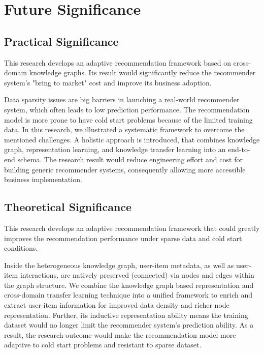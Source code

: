 \section{Future Significance}

\subsection{Practical Significance}
This research develops an adaptive recommendation framework based on cross-domain knowledge graphs. Its result would significantly reduce the recommender system's "bring to market" cost and improve its business adoption.

Data sparsity issues are big barriers in launching a real-world recommender system, which often leads to low prediction performance. 
The recommendation model is more prone to have cold start problems because of the limited training data. 
In this research, we illustrated a systematic framework to overcome the mentioned challenges. 
A holistic approach is introduced, that combines knowledge graph, representation learning, and knowledge transfer learning into an end-to-end schema. 
The research result would reduce engineering effort and cost for building generic recommender systems, consequently allowing more accessible business implementation.


\subsection{Theoretical Significance}
This research develops an adaptive recommendation framework that could greatly improves the recommendation performance under sparse data and cold start conditions.

Inside the heterogeneous knowledge graph, user-item metadata, as well as user-item interactions, are natively preserved (connected) via nodes and edges within the graph structure.  We combine the knowledge graph based representation and cross-domain transfer learning technique into a unified framework to enrich and extract user-item information for improved data density and richer node representation. Further, its inductive representation ability means the training dataset would no longer limit the recommender system's prediction ability. 
As a result, the research outcome would make the recommendation model more adaptive to cold start problems and resistant to sparse dataset.





